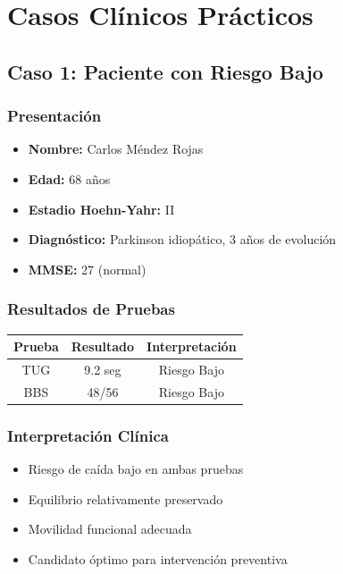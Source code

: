 \documentclass[12pt,a4paper,spanish,oneside]{book}
\begin{document}
\chapter{Casos Clínicos Prácticos}

\section{Caso 1: Paciente con Riesgo Bajo}

\subsection{Presentación}

\begin{itemize}
  \item \textbf{Nombre:} Carlos Méndez Rojas
  \item \textbf{Edad:} 68 años
  \item \textbf{Estadio Hoehn-Yahr:} II
  \item \textbf{Diagnóstico:} Parkinson idiopático, 3 años de evolución
  \item \textbf{MMSE:} 27 (normal)
\end{itemize}

\subsection{Resultados de Pruebas}

\begin{table}[h]
  \centering
  \begin{tabular}{|c|c|c|}
    \hline
    \textbf{Prueba} & \textbf{Resultado} & \textbf{Interpretación} \\
    \hline
    TUG & 9.2 seg & Riesgo Bajo \\
    \hline
    BBS & 48/56 & Riesgo Bajo \\
    \hline
  \end{tabular}
\end{table}

\subsection{Interpretación Clínica}

\begin{itemize}
  \item Riesgo de caída bajo en ambas pruebas
  \item Equilibrio relativamente preservado
  \item Movilidad funcional adecuada
  \item Candidato óptimo para intervención preventiva
\end{itemize}
\end{document}
